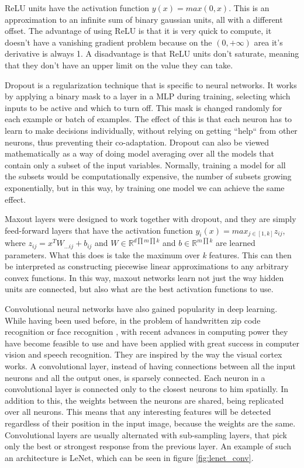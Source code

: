 ReLU units have the activation function $ y(x) = max(0,x) $. This is an approximation to an infinite sum of binary gaussian units, all with a different offset. The advantage of using ReLU is that it is very quick to compute, it doesn't have a vanishing gradient problem because on the $ (0, +\infty) $ area it's derivative is always 1. A disadvantage is that ReLU units don't saturate, meaning that they don't have an upper limit on the value they can take. 

Dropout is a regularization technique that is specific to neural networks. It works by applying a binary mask to a layer in a MLP during training, selecting which inputs to be active and which to turn off. This mask is changed randomly for each example or batch of examples. The effect of this is that each neuron has to learn to make decisions individually, without relying on getting ``help`` from other neurons, thus preventing their co-adaptation. Dropout can also be viewed mathematically as a way of doing model averaging over all the models that contain only a subset of the input variables. Normally, training a model for all the subsets would be computationally expensive, the number of subsets growing exponentially, but in this way, by training one model we can achieve the same effect. 

Maxout layers were designed to work together with dropout, and they are simply feed-forward layers that have the activation function $ y_i(x) = max_{j\in[1,k]} z_{ij} $, where $ z_{ij} = x^T W_{...ij} +b_{ij} $ and $ W \in \mathbb{R}^{d \prod m \prod k } $ and $ b \in \mathbb{R} ^{ m \prod k } $ are learned parameters. What this does is take the maximum over \textit{k} features. This can then be interpreted as constructing piecewise linear approximations to any arbitrary convex functions. In this way, maxout networks learn not just the way hidden units are connected, but also what are the best activation functions to use. 

Convolutional neural networks have also gained popularity in deep learning. While having been used before, in the problem of handwritten zip code recognition \cite{lecun1989backpropagation} or face recognition \cite{lawrence1997face}, with recent advances in computing power they have become feasible to use and have been applied with great success in computer vision and speech recognition. They are inspired by the way the visual cortex works. A convolutional layer, instead of having connections between all the input neurons and all the output ones, is sparsely connected. Each neuron in a convolutional layer is connected only to the closest neurons to him spatially. In addition to this, the weights between the neurons are shared, being replicated over all neurons. This means that any interesting features will be detected regardless of their position in the input image, because the weights are the same. Convolutional layers are usually alternated with sub-sampling layers, that pick only the best or strongest response from the previous layer. An example of such an architecture is LeNet, which can be seen in figure \ref{fig:lenet_conv}. 


